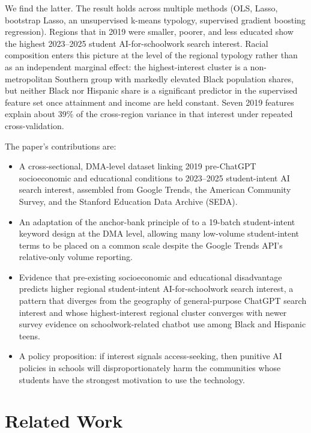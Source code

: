 \documentclass[11pt]{article}
\begin{document}
We find the latter. The result holds across multiple methods (OLS, Lasso, bootstrap Lasso, an unsupervised k-means typology, supervised gradient boosting regression). Regions that in 2019 were smaller, poorer, and less educated show the highest 2023--2025 student AI-for-schoolwork search interest. Racial composition enters this picture at the level of the regional typology rather than as an independent marginal effect: the highest-interest cluster is a non-metropolitan Southern group with markedly elevated Black population shares, but neither Black nor Hispanic share is a significant predictor in the supervised feature set once attainment and income are held constant. Seven 2019 features explain about 39\% of the cross-region variance in that interest under repeated cross-validation.

The paper's contributions are:
\begin{itemize}
    \item A cross-sectional, DMA-level dataset linking 2019 pre-ChatGPT socioeconomic and educational conditions to 2023--2025 student-intent AI search interest, assembled from Google Trends, the American Community Survey, and the Stanford Education Data Archive (SEDA).
    \item An adaptation of the anchor-bank principle of \citet{west2020} to a 19-batch student-intent keyword design at the DMA level, allowing many low-volume student-intent terms to be placed on a common scale despite the Google Trends API's relative-only volume reporting.
    \item Evidence that pre-existing socioeconomic and educational disadvantage predicts higher regional student-intent AI-for-schoolwork search interest, a pattern that diverges from the geography of general-purpose ChatGPT search interest and whose highest-interest regional cluster converges with newer survey evidence on schoolwork-related chatbot use among Black and Hispanic teens.
    \item A policy proposition: if interest signals access-seeking, then punitive AI policies in schools will disproportionately harm the communities whose students have the strongest motivation to use the technology.
\end{itemize}

\section{Related Work}
\end{document}
